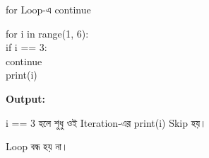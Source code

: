 \begin{codeoutputbox}{\textenglish{\ttfamily for} Loop-এ \textenglish{\ttfamily continue}}

\noindent
\begin{minipage}[t]{0.53\linewidth}
\codeheading

\begin{english}
\ttfamily
for i in range(1, 6):\\
\hspace*{4mm}if i == 3:\\
\hspace*{8mm}continue\\
\hspace*{4mm}print(i)
\end{english}

\end{minipage}
\hfill
\begin{minipage}[t]{0.43\linewidth}
\outputheading

\textbf{Output:}

\begin{center}
\textenglish{   }
\end{center}

\textenglish{\ttfamily i == 3}
হলে শুধু ওই Iteration-এর
\textenglish{\ttfamily print(i)}
Skip হয়।

Loop বন্ধ হয় না।

\end{minipage}

\end{codeoutputbox}


